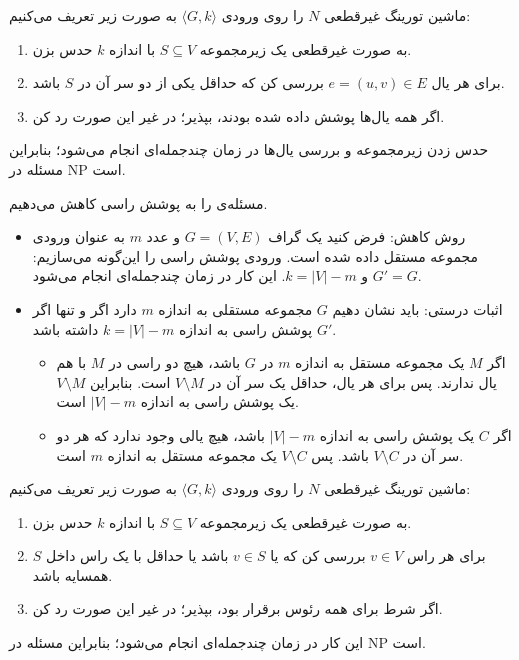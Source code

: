 
ماشین تورینگ غیرقطعی $N$ را روی ورودی $\langle G, k \rangle$ به صورت زیر تعریف می‌کنیم:
\begin{enumerate}
    \item به صورت غیرقطعی یک زیرمجموعه $S \subseteq V$ با اندازه $k$ حدس بزن.
    \item برای هر یال $e = (u, v) \in E$ بررسی کن که حداقل یکی از دو سر آن در $S$ باشد.
    \item اگر همه یال‌ها پوشش داده شده بودند، {بپذیر}؛ در غیر این صورت {رد کن}.
\end{enumerate}
حدس زدن زیرمجموعه و بررسی یال‌ها در زمان چندجمله‌ای انجام می‌شود؛ بنابراین مسئله در NP است.

مسئله‌ی  را به پوشش راسی کاهش می‌دهیم.

\begin{itemize}
    \item {روش کاهش:} فرض کنید یک گراف $G=(V, E)$ و عدد $m$ به عنوان ورودی مجموعه مستقل داده شده است. ورودی پوشش راسی را این‌گونه می‌سازیم: $G' = G$ و $k = |V| - m$. این کار در زمان چندجمله‌ای انجام می‌شود.

    \item {اثبات درستی:} باید نشان دهیم $G$ مجموعه مستقلی به اندازه $m$ دارد اگر و تنها اگر $G'$ پوشش راسی به اندازه $k = |V| - m$ داشته باشد.
    \begin{itemize}
        \item اگر $M$ یک مجموعه مستقل به اندازه $m$ در $G$ باشد، هیچ دو راسی در $M$ با هم یال ندارند. پس برای هر یال، حداقل یک سر آن در $V \setminus M$ است. بنابراین $V \setminus M$ یک پوشش راسی به اندازه $|V| - m$ است.
        \item اگر $C$ یک پوشش راسی به اندازه $|V|-m$ باشد، هیچ یالی وجود ندارد که هر دو سر آن در $V \setminus C$ باشد. پس $V \setminus C$ یک مجموعه مستقل به اندازه $m$ است.
    \end{itemize}
\end{itemize}


ماشین تورینگ غیرقطعی $N$ را روی ورودی $\langle G, k \rangle$ به صورت زیر تعریف می‌کنیم:
\begin{enumerate}
    \item به صورت غیرقطعی یک زیرمجموعه $S \subseteq V$ با اندازه $k$ حدس بزن.
    \item برای هر راس $v \in V$ بررسی کن که یا $v \in S$ باشد یا حداقل با یک راس داخل $S$ همسایه باشد.
    \item اگر شرط برای همه رئوس برقرار بود، {بپذیر}؛ در غیر این صورت {رد کن}.
\end{enumerate}
این کار در زمان چندجمله‌ای انجام می‌شود؛ بنابراین مسئله در NP است.

